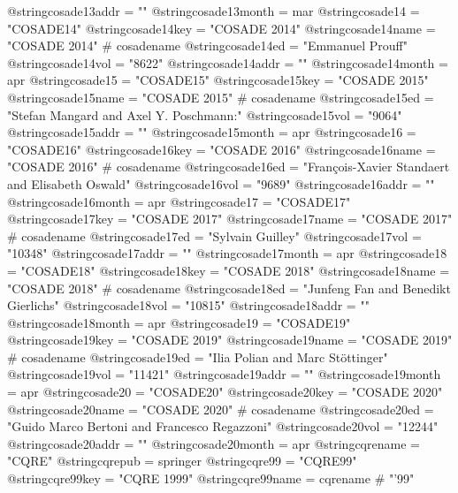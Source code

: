 @string{cosade13addr =          ""}
@string{cosade13month =         mar}
@string{cosade14 =              "COSADE14"}
@string{cosade14key =           "COSADE 2014"}
@string{cosade14name =          "COSADE 2014" # cosadename}
@string{cosade14ed =            "Emmanuel Prouff"}
@string{cosade14vol =           "8622"}
@string{cosade14addr =          ""}
@string{cosade14month =         apr}
@string{cosade15 =              "COSADE15"}
@string{cosade15key =           "COSADE 2015"}
@string{cosade15name =          "COSADE 2015" # cosadename}
@string{cosade15ed =            "Stefan Mangard and Axel Y. Poschmann:"}
@string{cosade15vol =           "9064"}
@string{cosade15addr =          ""}
@string{cosade15month =         apr}
@string{cosade16 =              "COSADE16"}
@string{cosade16key =           "COSADE 2016"}
@string{cosade16name =          "COSADE 2016" # cosadename}
@string{cosade16ed =            "Fran{\c c}ois-Xavier Standaert and Elisabeth Oswald"}
@string{cosade16vol =           "9689"}
@string{cosade16addr =          ""}
@string{cosade16month =         apr}
@string{cosade17 =              "COSADE17"}
@string{cosade17key =           "COSADE 2017"}
@string{cosade17name =          "COSADE 2017" # cosadename}
@string{cosade17ed =            "Sylvain Guilley"}
@string{cosade17vol =           "10348"}
@string{cosade17addr =          ""}
@string{cosade17month =         apr}
@string{cosade18 =              "COSADE18"}
@string{cosade18key =           "COSADE 2018"}
@string{cosade18name =          "COSADE 2018" # cosadename}
@string{cosade18ed =            "Junfeng Fan and Benedikt Gierlichs"}
@string{cosade18vol =           "10815"}
@string{cosade18addr =          ""}
@string{cosade18month =         apr}
@string{cosade19 =              "COSADE19"}
@string{cosade19key =           "COSADE 2019"}
@string{cosade19name =          "COSADE 2019" # cosadename}
@string{cosade19ed =            "Ilia Polian and Marc St{\"o}ttinger"}
@string{cosade19vol =           "11421"}
@string{cosade19addr =          ""}
@string{cosade19month =         apr}
@string{cosade20 =              "COSADE20"}
@string{cosade20key =           "COSADE 2020"}
@string{cosade20name =          "COSADE 2020" # cosadename}
@string{cosade20ed =            "Guido Marco Bertoni and Francesco Regazzoni"}
@string{cosade20vol =           "12244"}
@string{cosade20addr =          ""}
@string{cosade20month =         apr}
@string{cqrename =              "CQRE"}
@string{cqrepub =               springer}
@string{cqre99 =                "CQRE99"}
@string{cqre99key =             "CQRE 1999"}
@string{cqre99name =            cqrename # "'99"}
